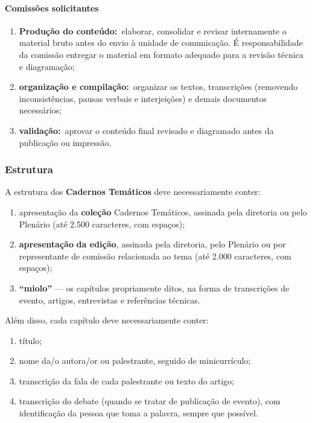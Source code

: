 \paragraph{Comissões solicitantes}

\begin{enumerate}

  \item
        \textbf{Produção do conteúdo:}~elaborar, consolidar e revisar
        internamente o material bruto antes do envio à unidade de comunicação.
        É responsabilidade da comissão entregar o material em formato adequado
        para a revisão técnica e diagramação;
  \item
        \textbf{organização e compilação:}~organizar os textos, transcrições
        (removendo inconsistências, pausas verbais e interjeições) e demais
        documentos necessários;
  \item
        \textbf{validação:}~aprovar o conteúdo final revisado e diagramado
        antes da publicação ou impressão.
\end{enumerate}

\subsubsection{Estrutura}

A estrutura dos \textbf{Cadernos Temáticos} deve necessariamente conter:

\begin{enumerate}

  \item
        apresentação da \textbf{coleção} Cadernos Temáticos, assinada pela
        diretoria ou pelo Plenário (até 2.500 caracteres, com espaços);
  \item
        \textbf{apresentação} \textbf{da edição}, assinada pela diretoria,
        pelo Plenário ou por representante de comissão relacionada ao tema
        (até 2.000 caracteres, com espaços);
  \item
        \textbf{``miolo''} --- os capítulos propriamente ditos, na forma de
        transcrições de evento, artigos, entrevistas e referências técnicas.
\end{enumerate}

Além disso, cada capítulo deve necessariamente conter:

\begin{enumerate}

  \item
        título;
  \item
        nome da/o autora/or ou palestrante, seguido de minicurrículo;
  \item
        transcrição da fala de cada palestrante ou texto do artigo;
  \item
        transcrição do debate (quando se tratar de publicação de evento), com
        identificação da pessoa que toma a palavra, sempre que possível.
\end{enumerate}


